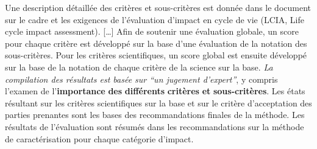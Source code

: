 {  Une description détaillée des critères et sous-critères est donnée dans le document sur le cadre et les exigences de l'évaluation d'impact en cycle de vie (LCIA, Life cycle impact assessment).
  [\ldots]
  Afin de soutenir une évaluation globale, un score pour chaque critère est développé sur la base d'une évaluation de la notation des sous-critères.
  Pour les critères scientifiques, un score global est ensuite développé sur la base de la notation de chaque critère de la science sur la base.
  \emph{La compilation des résultats est basée sur ``un jugement d'expert''}, y compris l'examen de l'\textbf{importance} \textbf{des} \textbf{différents} \textbf{critères} \textbf{et} \textbf{sous-critères}.
  Les états résultant sur les critères scientifiques sur la base et sur le critère d'acceptation des parties prenantes sont les bases des recommandations finales de la méthode.
  Les résultats de l'évaluation sont résumés dans les recommandations sur la méthode de caractérisation pour chaque catégorie d'impact.
%  
%  
%  
%  
%  
}
